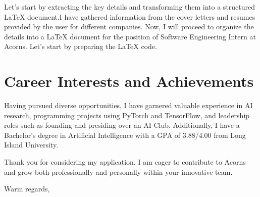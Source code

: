 Let's start by extracting the key details and transforming them into a structured LaTeX document.I have gathered information from the cover letters and resumes provided by the user for different companies. Now, I will proceed to organize the details into a LaTeX document for the position of Software Engineering Intern at Acorns. Let's start by preparing the LaTeX code.\documentclass{article}
\begin{document}
\section*{Career Interests and Achievements}
Having pursued diverse opportunities, I have garnered valuable experience in AI research, programming projects using PyTorch and TensorFlow, and leadership roles such as founding and presiding over an AI Club. Additionally, I have a Bachelor's degree in Artificial Intelligence with a GPA of 3.88/4.00 from Long Island University.

Thank you for considering my application. I am eager to contribute to Acorns and grow both professionally and personally within your innovative team.

Warm regards,\\
[Your Name]
\end{document}
